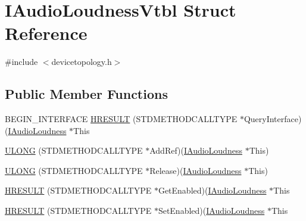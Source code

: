 \hypertarget{struct_i_audio_loudness_vtbl}{}\section{I\+Audio\+Loudness\+Vtbl Struct Reference}
\label{struct_i_audio_loudness_vtbl}


{\ttfamily \#include $<$devicetopology.\+h$>$}

\subsection*{Public Member Functions}
\begin{DoxyCompactItemize}
\item 
B\+E\+G\+I\+N\+\_\+\+I\+N\+T\+E\+R\+F\+A\+CE \hyperlink{struct_i_audio_loudness_vtbl_a0e3215d8e56e6752f6752799912f993b}{H\+R\+E\+S\+U\+LT} (S\+T\+D\+M\+E\+T\+H\+O\+D\+C\+A\+L\+L\+T\+Y\+PE $\ast$Query\+Interface)(\hyperlink{devicetopology_8h_a1dfe19b110985d1eb212e3106d6744fa}{I\+Audio\+Loudness} $\ast$This
\item 
\hyperlink{struct_i_audio_loudness_vtbl_a064efabb5a291bc0099c7afb06df28df}{U\+L\+O\+NG} (S\+T\+D\+M\+E\+T\+H\+O\+D\+C\+A\+L\+L\+T\+Y\+PE $\ast$Add\+Ref)(\hyperlink{devicetopology_8h_a1dfe19b110985d1eb212e3106d6744fa}{I\+Audio\+Loudness} $\ast$This)
\item 
\hyperlink{struct_i_audio_loudness_vtbl_af8ce8ffdf0d1e943eefe868daf42bf9a}{U\+L\+O\+NG} (S\+T\+D\+M\+E\+T\+H\+O\+D\+C\+A\+L\+L\+T\+Y\+PE $\ast$Release)(\hyperlink{devicetopology_8h_a1dfe19b110985d1eb212e3106d6744fa}{I\+Audio\+Loudness} $\ast$This)
\item 
\hyperlink{struct_i_audio_loudness_vtbl_af5c485089ff0df6de0165bfe284d407e}{H\+R\+E\+S\+U\+LT} (S\+T\+D\+M\+E\+T\+H\+O\+D\+C\+A\+L\+L\+T\+Y\+PE $\ast$Get\+Enabled)(\hyperlink{devicetopology_8h_a1dfe19b110985d1eb212e3106d6744fa}{I\+Audio\+Loudness} $\ast$This
\item 
\hyperlink{struct_i_audio_loudness_vtbl_ae4485beaccc12c32e787160a90cd942f}{H\+R\+E\+S\+U\+LT} (S\+T\+D\+M\+E\+T\+H\+O\+D\+C\+A\+L\+L\+T\+Y\+PE $\ast$Set\+Enabled)(\hyperlink{devicetopology_8h_a1dfe19b110985d1eb212e3106d6744fa}{I\+Audio\+Loudness} $\ast$This
\end{DoxyCompactItemize}
